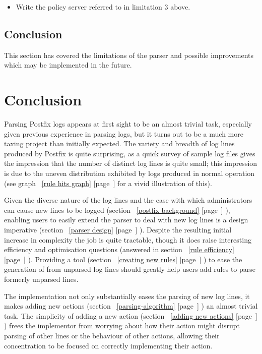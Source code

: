 \documentclass[a4paper,12pt,draft]{article}
\newcommand{\refwithpage}[1]{%
    \empty{}\ref{#1} [page~\pageref{#1}]%
}
\begin{document}
\begin{itemize}

    \item Write the policy server referred to in limitation 3 above.

\end{itemize}

\subsection{Conclusion}

This section has covered the limitations of the parser and possible
improvements which may be implemented in the future.

\newpage
\section{Conclusion}

\label{conclusion}

Parsing Postfix logs appears at first sight to be an almost trivial task,
especially given previous experience in parsing logs, but it turns out to
be a much more taxing project than initially expected.  The variety and
breadth of log lines produced by Postfix is quite surprising, as a quick
survey of sample log files gives the impression that the number of distinct
log lines is quite small; this impression is due to the uneven distribution
exhibited by logs produced in normal operation (see graph~\refwithpage{rule
hits graph} for a vivid illustration of this).  


Given the diverse nature of the log lines and the ease with which
administrators can cause new lines to be logged
(section~\refwithpage{postfix background}), enabling users to easily extend
the parser to deal with new log lines is a design imperative
(section~\refwithpage{parser design}).  Despite the resulting initial
increase in complexity the job is quite tractable, though it does raise
interesting efficiency and optimisation questions (answered in
section~\refwithpage{rule efficiency}).  Providing a tool
(section~\refwithpage{creating new rules}) to ease the generation of
\regexes{} from unparsed log lines should greatly help users add rules to
parse formerly unparsed lines.


The implementation not only substantially eases the parsing of new log
lines, it makes adding new actions
(section~\refwithpage{parsing-algorithm}) an almost trivial task.  The
simplicity of adding a new action (section~\refwithpage{adding new
actions}) frees the implementor from worrying about how their action might
disrupt parsing of other lines or the behaviour of other actions, allowing
their concentration to be focused on correctly implementing their action.
\end{document}

